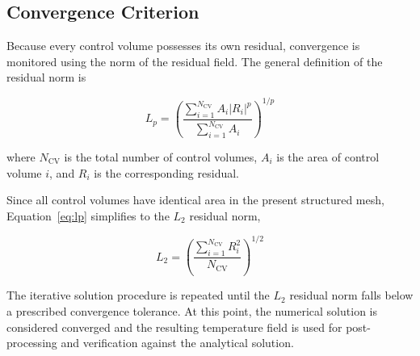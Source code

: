 
\subsection{Convergence Criterion}

Because every control volume possesses its own residual, convergence is monitored using the norm of the residual field. The general definition of the residual norm is

\begin{equation}
L_p
=
\left(
\frac{
\sum_{i=1}^{N_{\mathrm{CV}}}
A_i
|R_i|^p
}
{
\sum_{i=1}^{N_{\mathrm{CV}}}
A_i
}
\right)^{1/p}
\label{eq:lp}
\end{equation}

where $N_{\mathrm{CV}}$ is the total number of control volumes, $A_i$ is the area of control volume $i$, and $R_i$ is the corresponding residual.

Since all control volumes have identical area in the present structured mesh, Equation~\ref{eq:lp} simplifies to the $L_2$ residual norm,

\begin{equation}
L_2
=
\left(
\frac{
\sum_{i=1}^{N_{\mathrm{CV}}}
R_i^2
}
{N_{\mathrm{CV}}}
\right)^{1/2}
\label{eq:l2}
\end{equation}

The iterative solution procedure is repeated until the $L_2$ residual norm falls below a prescribed convergence tolerance. At this point, the numerical solution is considered converged and the resulting temperature field is used for post-processing and verification against the analytical solution.

